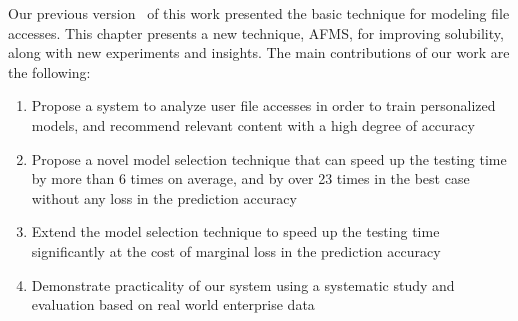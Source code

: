 Our previous version~\cite{dwiticeis15} of this work presented the
basic technique for modeling file accesses.  This chapter presents a
new technique, AFMS, for improving solubility, along with new
experiments and insights.  The main contributions of our work are the
following:
\begin{enumerate}
\item Propose a system to analyze user file accesses in order to train
  personalized models, and recommend relevant content with a high
  degree of accuracy
\item Propose a novel model selection technique that can speed up the
  testing time by more than 6 times on average, and by over 23 times in the best case
  without any loss in the prediction accuracy
\item Extend the model selection technique to speed up the testing time
  significantly at the cost of marginal loss in the prediction accuracy
\item Demonstrate practicality of our system using a systematic study
  and evaluation based on real world enterprise data
\end{enumerate}

%
%
%
%
%



